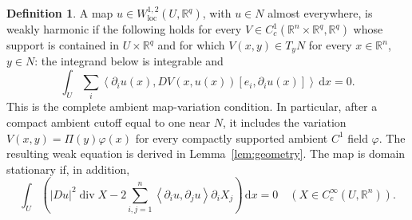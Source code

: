 \documentclass[reqno,11pt]{amsart}
\numberwithin{equation}{section}
\theoremstyle{definition}
\newtheorem{definition}[theorem]{Definition}
\theoremstyle{remark}
\newcommand{\R}{\mathbb R}
\newcommand{\dd}{\,\mathrm d}
\newcommand{\dx}{\dd x}
\newcommand{\loc}{\mathrm{loc}}
\newcommand{\diver}{\operatorname{div}}
\newcommand{\pair}[2]{\left\langle#1,#2\right\rangle}
\begin{document}
\begin{definition}\label{def:weak}
A map $u\in W^{1,2}_{\loc}(U,\R^q)$, with $u\in N$ almost everywhere, is
weakly harmonic if the following holds for every
$V\in C_c^1(\R^n\times\R^q,\R^q)$ whose support is contained in
$U\times\R^q$ and for which $V(x,y)\in T_yN$ for every $x\in\R^n$,
$y\in N$: the integrand below is integrable and
\begin{equation}\label{eq:map-variation}
 \int_U\sum_i\pair{\partial_i u(x)}
 {DV(x,u(x))[e_i,\partial_i u(x)]}\dx=0.
\end{equation}
This is the complete ambient map-variation condition. In particular,
after a compact ambient cutoff equal to one near $N$, it includes the
variation $V(x,y)=\Pi(y)\varphi(x)$ for every compactly supported
ambient $C^1$ field $\varphi$. The resulting weak equation is derived
in Lemma~\ref{lem:geometry}. The map is domain stationary if, in addition,
\begin{equation}\label{eq:stress}
 \int_U\left(|Du|^2\diver X
 -2\sum_{i,j=1}^n\pair{\partial_i u}{\partial_j u}\partial_iX_j\right)\dx=0
 \quad(X\in C_c^\infty(U,\R^n)).
\end{equation}
\end{definition}
\end{document}
